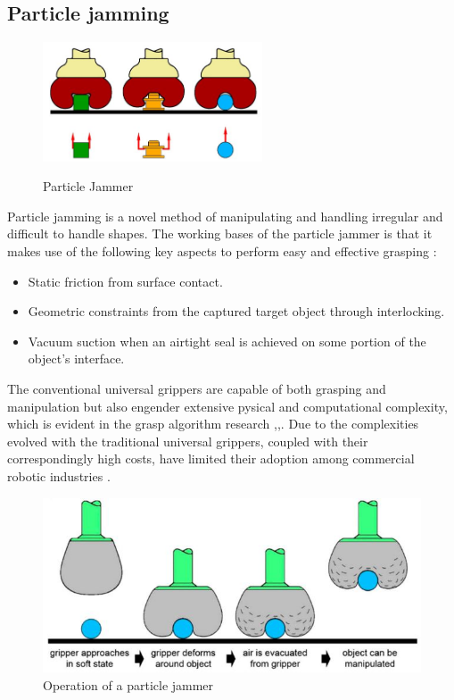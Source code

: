 \documentclass[11pt]{article}
\begin{document}
\pagebreak
\subsection{Particle jamming}
\begin{figure}
\begin{center}
\caption{Particle Jammer}
\includegraphics[width=6.5cm]{jammer1}
\label{jammer1}
\end{center}
\end{figure}
Particle jamming is a novel method of manipulating and handling irregular and difficult to handle shapes. The working bases of the particle jammer is that it makes use of the following key aspects to perform easy and effective grasping \cite{amend2012positive}:
\begin{itemize}
\item Static friction from surface contact.
\item Geometric constraints from the captured target object through interlocking.
\item Vacuum suction when an airtight seal is achieved on some portion of the object's interface.  
\end{itemize}
The conventional universal grippers are capable of both grasping and manipulation but also engender extensive pysical and computational complexity, which is evident in the grasp algorithm research \cite{miller2003automatic},\cite{shimoga1996robot},\cite{saxena2008robotic}. Due to the complexities evolved with the traditional universal grippers, coupled with their correspondingly high costs, have limited their adoption among commercial robotic industries \cite{amend2012positive}.

\begin{figure}[h]
\centering
\includegraphics[scale=0.8]{jammer2}
\caption{Operation of a particle jammer}
\label{fig:jammer2}
\end{figure}
\end{document}
